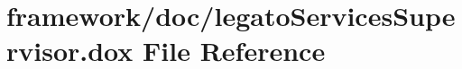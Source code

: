 \hypertarget{legato_services_supervisor_8dox}{}\section{framework/doc/legato\+Services\+Supervisor.dox File Reference}
\label{legato_services_supervisor_8dox}
